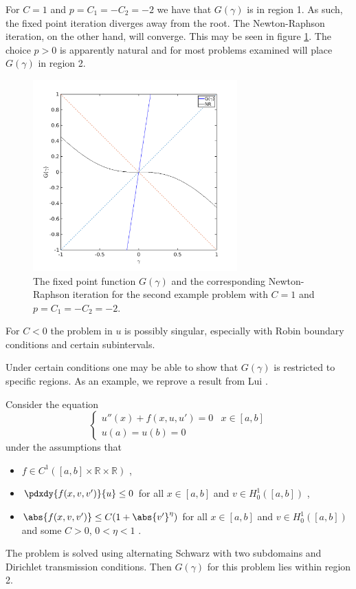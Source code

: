 \documentclass{article}
\begin{document}
For $C=1$ and $p = C_1 = -C_2 = -2$ we have that $G(\gamma)$ is in region 1.
As such, the fixed point iteration diverges away from the root.
The Newton-Raphson iteration, on the other hand, will converge.
This may be seen in figure \ref{fig:exCsin3}.
The choice $p>0$ is apparently natural and for most problems examined will place $G(\gamma)$ in region 2.

\begin{figure}
\centering
\includegraphics[width=0.7\textwidth]{exp12_03.png}
\caption{The fixed point function $G(\gamma)$ and the corresponding Newton-Raphson iteration for the second example problem with $C=1$ and $p=C_1 = -C_2 = -2$.}
\label{fig:exCsin3}
\end{figure}

For $C<0$ the problem in $u$ is possibly singular, especially with Robin boundary conditions and certain subintervals.

Under certain conditions one may be able to show that $G(\gamma)$ is restricted to specific regions.
As an example, we reprove a result from Lui \cite{lui1999schwarz}.

\begin{thm} \label{thm:lui}
Consider the equation
\begin{equation*}
\begin{cases} u''(x) + f(x,u,u') = 0 & x \in [a,b] \\ u(a) = u(b) = 0 \end{cases}
\end{equation*}
under the assumptions that
\begin{itemize}
\item $f \in C^1 \left ( [a,b] \times \mathbb{R} \times \mathbb{R} \right )$ ,
\item $\pdxdy{f(x,v,v')}{u} \leq 0$ for all $x \in [a,b]$ and $v \in H_0^1([a,b])$ ,
\item $\abs{f(x,v,v')} \leq C(1 + \abs{v'}^\eta)$ for all $x \in [a,b]$ and $v \in H_0^1([a,b])$ and some $C > 0$, $0 < \eta < 1$ .
\end{itemize}
The problem is solved using alternating Schwarz with two subdomains and Dirichlet transmission conditions.
Then $G(\gamma)$ for this problem lies within region 2.
\end{thm}
\end{document}

